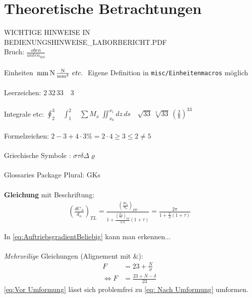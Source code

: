 \section{Theoretische Betrachtungen}
\label{chap:Theoretische_Betrachtungen}
WICHTIGE HINWEISE IN BEDIENUNGSHINWEISE\_LABORBERICHT.PDF\\


Bruch: $\frac{oben}{unten_{\text{tief}}}$\\ \\
Einheiten $\,\mathrm{mm} \,\mathrm{N} \,\mathrm{\frac{N}{mm^2}} \ etc.\ $ Eigene Definition in \verb|misc/Einheitenmacros| möglich\\ \\ 
Leerzeichen: $2\ 3 2\,3 3 \quad3$\\ \\
Integrale etc: $\oint^3_2 \quad \int^2_1 \quad \sum M_x\ \iint_{x_{0}}^{x_1}dz\,ds \quad  \sqrt{33} \ \sqrt[3]{33} \ \left(\frac{2}{8}\right)^{33} \ $\\ \\
Formelzeichen: $2-3+4 \cdot 3 \% = 2\cdot 4 \geq 3 \leq 2 \neq 5 $ \\ \\
Griechische Symbole : $\sigma \tau \delta \Delta \varrho$\\ \\
Glossaries Package Plural: \glspl{GK} \\ \\

\textbf{Gleichung} mit Beschriftung:
\begin{align} \label{eq:AuftriebsgradientBeliebig}
     {\left( \frac{dC_A}{d_\alpha} \right)}_\textit{TL} =  \frac{{\left(\frac{dc_a}{d_\alpha}\right)}_{PT}} {1+\frac{{\left(\frac{dc_a}{d_\alpha}\right)}_{PT}}{\pi\Lambda}(1+\tau)} = \frac{2\pi}{1+{\frac{2}{\Lambda}}(1+\tau)}
\end{align}


In \autoref{eq:AuftriebsgradientBeliebig} kann man erkennen...\\ \\
\textit{Mehrzeilige} Gleichungen (Alignement mit \&):
\begin{align} \label{eq:Vor Umformung}
    F&= 23 + \frac{N}{\sigma} \\
    \label{eq: Nach Umformung}
  \Leftrightarrow F&= \frac{23+N-\delta}{23}
\end{align}
\autoref{eq:Vor Umformung} lässt sich problemfrei zu \autoref{eq: Nach Umformung} umformen.
\clearpage



